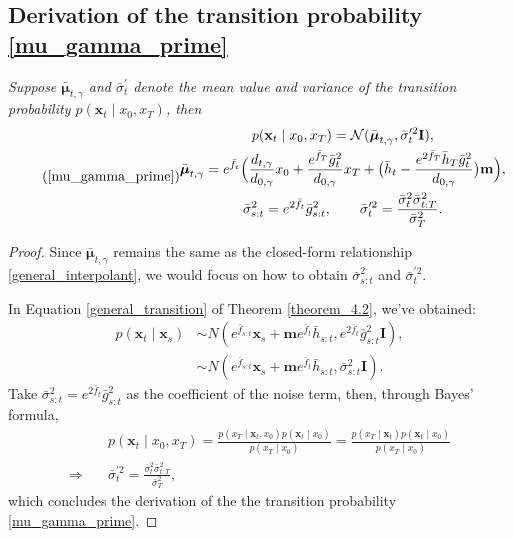 \subsection{Derivation of the transition probability \eqref{mu_gamma_prime}}\label{proof_derivation_transition_prob}
\noindent \textit{Suppose $\bar{\boldsymbol{\mu}}_{t, \gamma}$ and $\bar{\sigma}_t^{\prime}$ denote the mean value and variance of the transition probability $p(\mathbf{x}_t \mid x_0, x_T)$, then}
\begin{equation}\tag{\ref{mu_gamma_prime}}
\begin{gathered}
p(\mathbf{x}_t\mid x_0, x_T)=\mathcal{N}(\bar{\boldsymbol{\mu}}_{t, \gamma},\bar{\sigma}_t^{\prime2}\mathbf{I}), \\
\bar{\boldsymbol{\mu}}_{t, \gamma} = e^{\bar{f}_{t}} \Big(\frac{d_{t, \gamma}}{d_{0, \gamma}} x_0 + \frac{e^{\bar{f}_{T}} \bar{g}^2_{t}}{d_{0, \gamma}} x_T + \big(\bar{h}_{t} - \frac{e^{2\bar{f}_{T}} \bar{h}_{T} \bar{g}^2_{t}}{d_{0, \gamma}}\big) \mathbf{m}\Big), \\
\bar{\sigma}_{s:t}^2 = e^{2\bar{f}_t} \bar{g}^2_{s:t}, \quad \quad \bar{\sigma}_t^{\prime2}=\frac{\bar{\sigma}_t^2\bar{\sigma}_{t:T}^2}{\bar{\sigma}_T^2}.
\end{gathered}
\end{equation}
\begin{proof}
Since $\bar{\boldsymbol{\mu}}_{t, \gamma}$ remains the same as the closed-form relationship \eqref{general_interpolant}, we would focus on how to obtain $\bar{\sigma}_{s:t}^2$ and $\bar{\sigma}_t^{\prime2}$.

In Equation \eqref{general_transition} of Theorem \ref{theorem_4.2}, we've obtained: 
\begin{equation}
\begin{aligned}
p(\mathbf{x}_t \mid \mathbf{x}_s) &\sim N\left( e^{\bar{f}_{s:t}} \mathbf{x}_s + \mathbf{m} e^{\bar{f}_t} \bar{h}_{s:t}, e^{2\bar{f}_t}\bar{g}^2_{s:t} \mathbf{I}\right), \\
&\sim N\left( e^{\bar{f}_{s:t}} \mathbf{x}_s + \mathbf{m} e^{\bar{f}_t} \bar{h}_{s:t}, \bar{\sigma}_{s:t}^{2} \mathbf{I}\right).
\end{aligned}
\end{equation}
Take $\bar{\sigma}_{s:t}^2 = e^{2\bar{f}_t} \bar{g}^2_{s:t}$ as the coefficient of the noise term, then, through Bayes' formula, 
\begin{align*}
& p (\mathbf{x}_t \mid x_0, x_T) = \frac{p (x_T \mid \mathbf{x}_t, x_0) p (\mathbf{x}_t \mid x_0)}{p (x_T \mid x_0)} = \frac{p (x_T \mid \mathbf{x}_t) p (\mathbf{x}_t \mid x_0)}{p (x_T \mid x_0)} \\
\Rightarrow \quad & \bar{\sigma}_t^{\prime2} = \frac{\bar{\sigma}_{t}^{2} \bar{\sigma}_{t:T}^{2}}{\bar{\sigma}_{T}^{2}} ,
\end{align*}
which concludes the derivation of the the transition probability \eqref{mu_gamma_prime}.
\end{proof}



